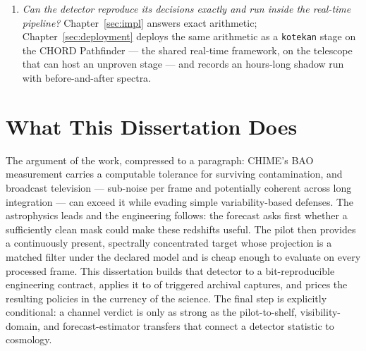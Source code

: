 \begin{enumerate}
\item[\textbf{RQ5.}] \emph{Can the detector reproduce its decisions exactly and
run inside the real-time pipeline?}  Chapter~\ref{sec:impl} answers exact
arithmetic; Chapter~\ref{sec:deployment} deploys the same arithmetic as a
\texttt{kotekan} stage on the CHORD Pathfinder --- the shared real-time
framework, on the telescope that can host an unproven stage --- and records an
hours-long shadow run with before-and-after spectra.
\end{enumerate}

\section{What This Dissertation Does}
\label{sec:intro:roadmap}

The argument of the work, compressed to a paragraph: CHIME's BAO measurement carries a computable tolerance for surviving contamination, and broadcast television --- sub-noise per frame and potentially coherent across long integration --- can exceed it while evading simple variability-based defenses. The astrophysics leads and the engineering follows: the forecast asks first whether a sufficiently clean mask could make these redshifts useful. The pilot then provides a continuously present, spectrally concentrated target whose projection is a matched filter under the declared model and is cheap enough to evaluate on every processed frame. This dissertation builds that detector to a bit-reproducible engineering contract, applies it to  of triggered archival captures, and prices the resulting policies in the currency of the science. The final step is explicitly conditional: a channel verdict is only as strong as the pilot-to-shelf, visibility-domain, and forecast-estimator transfers that connect a detector statistic to cosmology.

